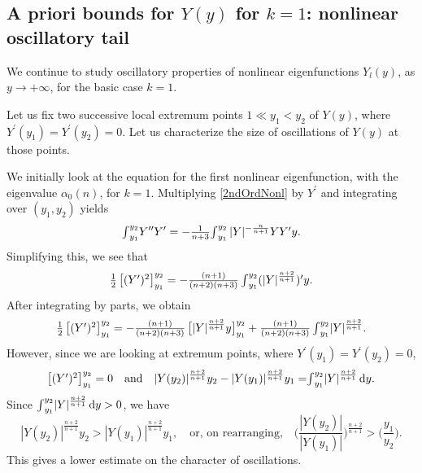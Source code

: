 \documentclass[12pt]{amsart}
\begin{document}
  {\smallskip}

 

 

\subsection{A priori bounds for  $Y(y)$ for $k=1$: nonlinear oscillatory tail}

We continue to study oscillatory properties of nonlinear
eigenfunctions $Y_l(y)$, as $y \to +{\infty}$, for the basic case $k=1$.
 
Let us fix two successive local extremum points  $1 \ll y_1<y_2$
of $Y(y)$, where $Y^\prime(y_1)=Y^\prime(y_2)=0$.
 Let us characterize the size of oscillations of $Y(y)$ at those
 points.
 

We initially look at the equation for the first nonlinear
eigenfunction, with the eigenvalue $\alpha_0(n)$, for $k=1$.
Multiplying \eqref{2ndOrdNonl} by $Y^\prime$ and integrating
over $(y_1, y_2)$ yields
\begin{equation*}
\mbox{$\int$}_{y_1}^{y_2} Y^{\prime\prime}Y^\prime =
\mbox{$-\frac{1}{n+3}$}\mbox{$ \int $}_{y_1}^{y_2} \,
\mbox{$|Y|^{-\frac{n}{n+1}}YY^\prime y$}.
\end{equation*}
Simplifying this, we see that
\begin{equation*}
\mbox{$\frac{1}{2}\,\big[(Y^\prime)^2\big]^{y_2}_{y_1}$} =
\mbox{$-\frac{(n+1)}{(n+2)(n+3)}$}\,\mbox{$ \int $}_{y_1}^{y_2}
\mbox{$(|Y|^{\frac{n+2}{n+1}})^\prime y$}.
\end{equation*}
After integrating by parts, we obtain
\begin{equation*}
\mbox{$\frac{1}{2}\,\big[(Y^\prime)^2\big]^{y_2}_{y_1}$} =
\mbox{$-\frac{(n+1)}{(n+2)(n+3)}\,\big[|Y|^{\frac{n+2}{n+1}}y\big]^{y_2}_{y_1}$}+
\mbox{$\frac{(n+1)}{(n+2)(n+3)}$}\,\mbox{$ \int $}_{y_1}^{y_2}
\mbox{$|Y|^{\frac{n+2}{n+1}}$}.
\end{equation*}
However, since we are looking at extremum points, where
$Y^\prime(y_1)=Y^\prime(y_2)=0$,
\begin{equation*}
\mbox{$\big[(Y^\prime)^2\big]^{y_2}_{y_1}$}=0
\quad \mbox{and} \quad
 
\mbox{$|Y(y_2)|^{\frac{n+2}{n+1}}y_2-|Y(y_1)|^{\frac{n+2}{n+1}}y_1
=$} \mbox{$ \int $}_{y_1}^{y_2} \mbox{$|Y|^{\frac{n+2}{n+1}} \,
\mathrm{d}y$}.
\end{equation*}
Since
 $\mbox{$ \int $}_{y_1}^{y_2} \mbox{$|Y|^{\frac{n+2}{n+1}} \,
\mathrm{d}y>0$}$,
we have
\begin{equation}
 \label{N11}
\mbox{$|Y(y_2)|^{\frac{n+2}{n+1}}y_2>|Y(y_1)|^{\frac{n+2}{n+1}}y_1$},
\quad \mbox{or, on rearranging,} \quad 
\mbox{$\big(\frac{|Y(y_2)|}{|Y(y_1)|}\big)^{\frac{n+2}{n+1}}>
\big( \frac{y_1}{y_2}\big)$}.
\end{equation}
This gives a lower estimate on the character of oscillations.
\end{document}
